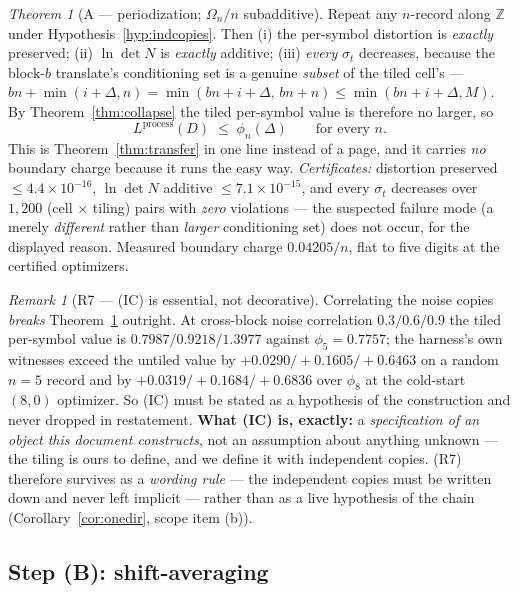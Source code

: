 \documentclass[11pt]{article}
\theoremstyle{definition}
\theoremstyle{remark}
\newtheorem{remark}{Remark}
\newtheorem{namedthm}{Theorem}
\begin{document}
\begin{namedthm}[A --- periodization; $\Omega_n/n$ subadditive]
\label{thm:period}
Repeat any $n$-record along $\mathbb Z$ under
Hypothesis~\ref{hyp:indcopies}. Then (i) the per-symbol distortion is
\emph{exactly} preserved; (ii) $\ln\det N$ is \emph{exactly} additive;
(iii) \emph{every} $\sigma_t$ decreases, because the block-$b$
translate's conditioning set is a genuine \emph{subset} of the tiled
cell's ---
$bn+\min(i+\Delta,n)=\min(bn+i+\Delta,\,bn+n)\le\min(bn+i+\Delta,M)$.
By Theorem~\ref{thm:collapse} the tiled per-symbol value is therefore
no larger, so
\[
L^{\mathrm{process}}(D)\;\le\;\phi_n(\Delta)\qquad\text{for every }n .
\]
This is Theorem~\ref{thm:transfer} in one line instead of a page, and
it carries \emph{no} boundary charge because it runs the easy way.
\emph{Certificates:} distortion preserved $\le4.4\times10^{-16}$,
$\ln\det N$ additive $\le7.1\times10^{-15}$, and every $\sigma_t$
decreases over $1{,}200$ (cell $\times$ tiling) pairs with \emph{zero}
violations --- the suspected failure mode (a merely \emph{different}
rather than \emph{larger} conditioning set) does not occur, for the
displayed reason. Measured boundary charge $0.04205/n$, flat to five
digits at the certified optimizers.
\end{namedthm}

\begin{remark}[R7 --- (IC) is essential, not decorative]
\label{rem:R7}
Correlating the noise copies \emph{breaks} Theorem~\ref{thm:period}
outright. At cross-block noise correlation $0.3/0.6/0.9$ the tiled
per-symbol value is $0.7987/0.9218/1.3977$ against $\phi_5=0.7757$;
the harness's own witnesses exceed the untiled value by
$+0.0290/+0.1605/+0.6463$ on a random $n=5$ record and by
$+0.0319/+0.1684/+0.6836$ over $\phi_8$ at the cold-start $(8,0)$
optimizer. So (IC) must be stated as a hypothesis of the construction
and never dropped in restatement. \textbf{What (IC) is, exactly:} a
\emph{specification of an object this document constructs}, not an
assumption about anything unknown --- the tiling is ours to define, and
we define it with independent copies. (R7) therefore survives as a
\emph{wording rule} --- the independent copies must be written down and
never left implicit --- rather than as a live hypothesis of the chain
(Corollary~\ref{cor:onedir}, scope item (b)).
\end{remark}

\subsection{Step (B): shift-averaging}
\end{document}

